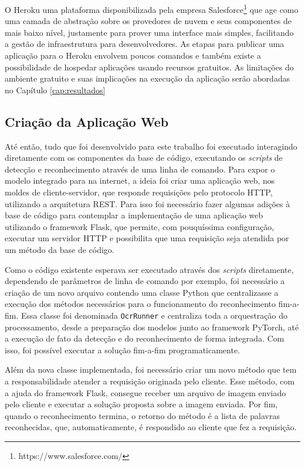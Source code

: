 O Heroku uma plataforma disponibilizada pela empresa Salesforce\footnote{https://www.salesforce.com/} que age como uma camada de abstração sobre os provedores de nuvem e seus componentes de mais baixo nível, justamente para prover uma interface mais simples, facilitando a gestão de infraestrutura para desenvolvedores. As etapas para publicar uma aplicação para o Heroku envolvem poucos comandos e também existe a possibilidade de hospedar aplicações usando recursos gratuitos. As limitações do ambiente gratuito e suas implicações na execução da aplicação serão abordadas no Capítulo \ref{cap:resultados}

\subsection{Criação da Aplicação Web}\label{sec:methodology_web_app}
Até então, tudo que foi desenvolvido para este trabalho foi executado interagindo diretamente com os componentes da base de código, executando os \textit{scripts} de detecção e reconhecimento através de uma linha de comando. Para expor o modelo integrado para na internet, a ideia foi criar uma aplicação web, nos moldes de cliente-servidor, que responde requisições pelo protocolo HTTP, utilizando a arquitetura REST. Para isso foi necessário fazer algumas adições à base de código para contemplar a implementação de uma aplicação web utilizando o framework Flask, que permite, com pouquíssima configuração, executar um servidor HTTP e possibilita que uma requisição seja atendida por um método da base de código.

Como o código existente esperava ser executado através dos \textit{scripts} diretamente, dependendo de parâmetros de linha de comando por exemplo, foi necessário a criação de um novo arquivo contendo uma classe Python que centralizasse a execução dos métodos necessários para o funcionamento do reconhecimento fim-a-fim. Essa classe foi denominada \texttt{OcrRunner} e centraliza toda a orquestração do processamento, desde a preparação dos modelos junto ao framework PyTorch, até a execução de fato da detecção e do reconhecimento de forma integrada. Com isso, foi possível executar a solução fim-a-fim programaticamente.

Além da nova classe implementada, foi necessário criar um novo método que tem a responsabilidade atender a requisição originada pelo cliente. Esse método, com a ajuda do framework Flask, consegue receber um arquivo de imagem enviado pelo cliente e executar a solução proposta sobre a imagem enviada. Por fim, quando o reconhecimento termina, o retorno do método é a lista de palavras reconhecidas, que, automaticamente, é respondido ao cliente que fez a requisição.

